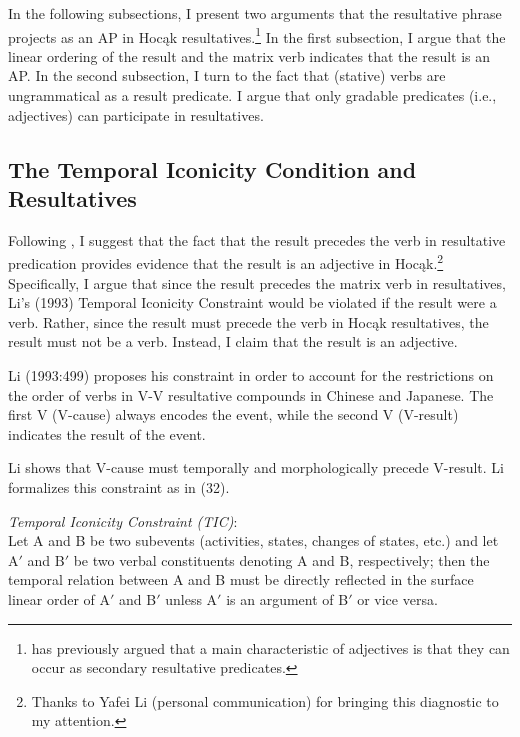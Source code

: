 \documentclass[output=paper]{LSP/langsci}
\begin{document}
In the following subsections, I present two arguments that the resultative phrase projects as an AP in Hocąk resultatives.\footnote{\citet{Baker2003} has previously argued that a main characteristic of adjectives is that they can occur as secondary resultative predicates.} In the first subsection, I argue that the linear ordering of the result and the matrix verb indicates that the result is an AP. In the second subsection, I turn to the fact that (stative) verbs are ungrammatical as a result predicate. I argue that only gradable predicates (i.e., adjectives) can participate in resultatives. 

\subsection{The Temporal Iconicity Condition and Resultatives}

Following \citet{Li1993}, I suggest that the fact that the result precedes the verb in resultative predication provides evidence that the result is an adjective in Hocąk.\footnote{Thanks to Yafei Li (personal communication) for bringing this diagnostic to my attention.} Specifically, I argue that since the result precedes the matrix verb in resultatives, Li's (1993) Temporal Iconicity Constraint would be violated if the result were a verb. Rather, since the result must precede the verb in Hocąk resultatives, the result must not be a verb. Instead, I claim that the result is an adjective.

Li (1993:499) proposes his constraint in order to account for the restrictions on the order of verbs in V-V resultative compounds in Chinese and Japanese. The first V (V-cause) always encodes the event, while the second V (V-result) indicates the result of the event. 

Li shows that V-cause must temporally and morphologically precede V-result. Li formalizes this constraint as in (32).

\begin{exe}

\ex
 \emph{Temporal Iconicity Constraint (TIC)}:\\
 Let A and B be two subevents (activities, states, changes of states, etc.) and let A$'$ and B$'$ be two verbal constituents denoting A and B, respectively; then the temporal relation between A and B must be directly reflected in the surface linear order of A$'$ and B$'$ unless A$'$ is an argument of B$'$ or vice versa.
 
 \end{exe}
\end{document}

